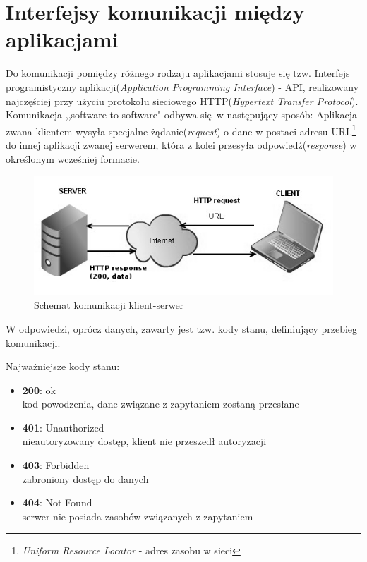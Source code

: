 \section{Interfejsy komunikacji między aplikacjami}
Do komunikacji pomiędzy różnego rodzaju aplikacjami stosuje się tzw. Interfejs programistyczny aplikacji(\emph{Application Programming Interface}) - API, realizowany najczęściej przy użyciu protokołu sieciowego HTTP(\emph{Hypertext Transfer Protocol}).
Komunikacja ,,software-to-software" odbywa się w następujący sposób:
Aplikacja zwana klientem wysyła specjalne żądanie(\emph{request}) o dane w postaci adresu URL\footnote{\emph{Uniform Resource Locator} - adres zasobu w sieci} do innej aplikacji zwanej serwerem, która z kolei przesyła odpowiedź(\emph{response}) w określonym wcześniej formacie.

\begin{figure}[h]
  \centering
    \includegraphics[scale=0.87]{images/http_communication.png}
  \caption{Schemat komunikacji klient-serwer}
\end{figure}

W odpowiedzi, oprócz danych, zawarty jest tzw. kody stanu, definiujący przebieg komunikacji.

Najważniejsze kody stanu:
 \begin{itemize}
     \item \textbf {200}: ok \\
     kod powodzenia, dane związane z zapytaniem zostaną przesłane
     \item \textbf {401}: Unauthorized \\
     nieautoryzowany dostęp, klient nie przeszedł autoryzacji
     \item \textbf {403}: Forbidden \\
     zabroniony dostęp do danych
     \item \textbf {404}: Not Found \\
     serwer nie posiada zasobów związanych z zapytaniem
  \end{itemize}

